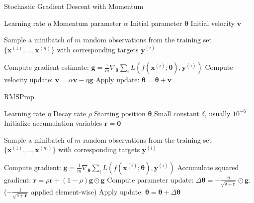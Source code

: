 \documentclass[./main.tex]{subfiles}
\begin{document}
\begin{algorithm}[htbp]
    \caption{Stochastic Gradient Descent with Momentum \cite{DeepLearning}}
    \label{Algorithm:SGD_momentum}
    \begin{algorithmic}[1]
        \Require Learning rate $\eta$
        \Require Momentum parameter $\alpha$
        \Require Initial parameter $\bm{\theta}$
        \Require Initial velocity $\bm{v}$
            \State \begin{varwidth}[t]{\linewidth}
            Sample a minibatch of $m$ random observations from the training set $\{\bm{x}^{(1)}, ..., \bm{x}^{(n)}\}$ with corresponding targets $\bm{y}^{(i)}$
            \end{varwidth} 
            \State Compute gradient estimate: $\bm{g} = \frac{1}{m} \nabla_{\bm{\theta}} \sum_i L\left( f \left( \bm{x}^{(i)}; \bm{\theta} \right), \bm{y}^{(i)} \right)$
            \State Compute velocity update: $\bm{v} = \alpha \bm{v} - \eta \bm{g}$
            \State Apply update: $\bm{\theta} = \bm{\theta} + \bm{v}$
        \EndWhile
    \end{algorithmic}
\end{algorithm}
\begin{algorithm}[htbp]
    \caption{RMSProp \cite{DeepLearning}}
    \label{Algorithm:RMSProp}
    \begin{algorithmic}[1]
        \Require Learning rate $\eta$
        \Require Decay rate $\rho$
        \Require Starting position $\bm{\theta}$
        \Require Small constant $\delta$, usually $10^{-6}$
        \State Initialize accumulation variables $\bm{r} = \bm{0}$
            \State \begin{varwidth}[t]{\linewidth}
            Sample a minibatch of $m$ random observations from the training set $\{\bm{x}^{(1)}, ..., \bm{x}^{(m)}\}$ with corresponding targets $\bm{y}^{(i)}$
            \end{varwidth}
            \State Compute gradient: $\bm{g} = \frac{1}{m} \nabla_{\bm{\theta}} \sum_i L\left( f \left(\bm{x}^{(i)}; \bm{\theta} \right), \bm{y}^{(i)} \right)$
            \State Accumulate squared gradient: $\bm{r} = \rho \bm{r} + (1 - \rho) \bm{g} \odot \bm{g}$
            \State Compute parameter update: $\Delta\bm{\theta} = - \frac{\eta}{\sqrt{\delta + \bm{r}}} \odot \bm{g}$. \quad ($- \frac{1}{\sqrt{\delta + \bm{r}}}$ applied element-wise)
            \State Apply update: $\bm{\theta} = \bm{\theta} + \Delta \bm{\theta}$ 
        \EndWhile
    \end{algorithmic}
\end{algorithm}
\end{document}

